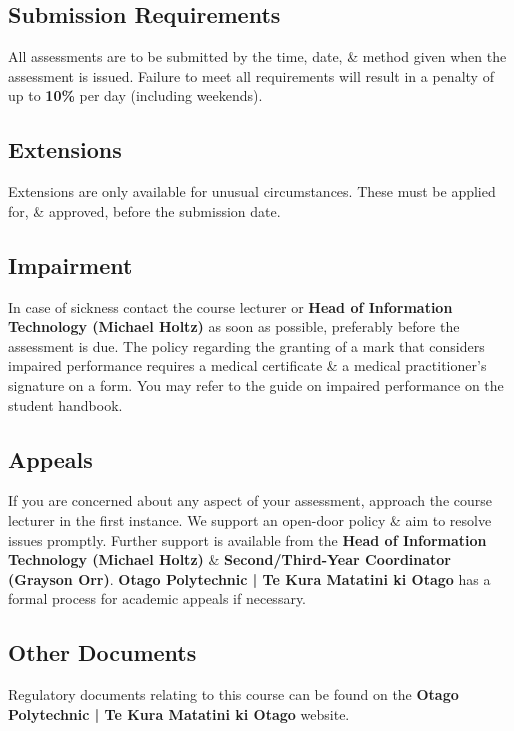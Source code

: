 \documentclass{article}
\begin{document}
\subsection*{Submission Requirements}
All assessments are to be submitted by the time, date, \& method given when the assessment is issued. Failure to meet all requirements will result in a penalty of up to \textbf{10\%} per day (including weekends).

\subsection*{Extensions}
Extensions are only available for unusual circumstances. These must be applied for, \& approved, before the submission date.

\subsection*{Impairment}
In case of sickness contact the course lecturer or \textbf{Head of Information Technology (Michael Holtz)} as soon as possible, preferably before the assessment is due. The policy regarding the granting of a mark that considers impaired performance requires a medical certificate \& a medical practitioner's signature on a form. You may refer to the guide on impaired performance on the student handbook.

\subsection*{Appeals}
If you are concerned about any aspect of your assessment, approach the course lecturer in the first instance. We support an open-door policy \& aim to resolve issues promptly. Further support is available from the \textbf{Head of Information Technology (Michael Holtz)} \& \textbf{Second/Third-Year Coordinator (Grayson Orr)}. \textbf{Otago Polytechnic | Te Kura Matatini ki Otago} has a formal process for academic appeals if necessary.

\subsection*{Other Documents}
Regulatory documents relating to this course can be found on the \textbf{Otago Polytechnic | Te Kura Matatini ki Otago} website.
\end{document}

